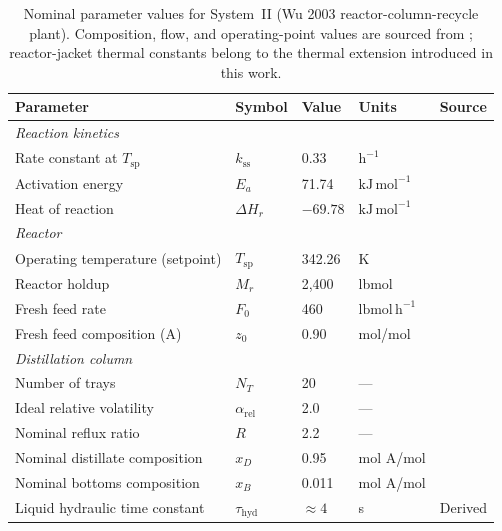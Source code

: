 \documentclass[aps,pre,twocolumn,superscriptaddress,floatfix]{revtex4-2}
\begin{document}
\begin{table}[tbp]
\centering
\caption{Nominal parameter values for System~II (Wu 2003 reactor-column-recycle plant). Composition, flow, and operating-point values are sourced from \citet[Table~1]{Wu2003}; reactor-jacket thermal constants belong to the thermal extension introduced in this work.}
\label{tab:si_wu_params}
\small
\begin{tabular}{lllll}
\toprule
Parameter & Symbol & Value & Units & Source \\
\midrule
\multicolumn{5}{l}{\textit{Reaction kinetics}} \\
Rate constant at $T_\mathrm{sp}$ & $k_\mathrm{ss}$ & 0.33 & $\mathrm{h}^{-1}$ & \citealt{Wu2003} \\
Activation energy & $E_a$ & 71.74 & $\mathrm{kJ\,mol}^{-1}$ & \citealt{Wu2003} \\
Heat of reaction & $\Delta H_r$ & $-69.78$ & $\mathrm{kJ\,mol}^{-1}$ & \citealt{Wu2003} \\
\midrule
\multicolumn{5}{l}{\textit{Reactor}} \\
Operating temperature (setpoint) & $T_\mathrm{sp}$ & 342.26 & K & \citealt{Wu2003} \\
Reactor holdup & $M_r$ & 2{,}400 & lbmol & \citealt{Wu2003} \\
Fresh feed rate & $F_0$ & 460 & $\mathrm{lbmol\,h}^{-1}$ & \citealt{Wu2003} \\
Fresh feed composition (A) & $z_0$ & 0.90 & mol/mol & \citealt{Wu2003} \\
\midrule
\multicolumn{5}{l}{\textit{Distillation column}} \\
Number of trays & $N_T$ & 20 & — & \citealt{Wu2003} \\
Ideal relative volatility & $\alpha_\mathrm{rel}$ & 2.0 & — & \citealt{Wu2003} \\
Nominal reflux ratio & $R$ & 2.2 & — & \citealt{Wu2003} \\
Nominal distillate composition & $x_D$ & 0.95 & mol A/mol & \citealt{Wu2003} \\
Nominal bottoms composition & $x_B$ & 0.011 & mol A/mol & \citealt{Wu2003} \\
Liquid hydraulic time constant & $\tau_\mathrm{hyd}$ & $\approx 4$ & s & Derived \\
\bottomrule
\end{tabular}
\end{table}
\end{document}
